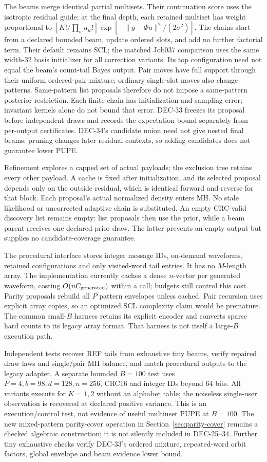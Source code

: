 \documentclass[10pt,a4paper]{article}
\begin{document}
The beams merge identical partial multisets. Their continuation score uses the isotropic residual guide;
at the final depth, each retained multiset has weight proportional to
$[K!/\prod_w a_w!]\exp[-\|y-\Phi a\|^2/(2\sigma^2)]$.
The chains start from a declared bounded beam, update ordered slots, and add no further factorial term.
Their default remains SCL; the matched Job037 comparison uses the same width-32 basis initializer for
all correction variants. Its top configuration need not equal the beam's count-tail Bayes output.
Pair moves have full support through their uniform ordered-pair mixture; ordinary single-slot moves also
change patterns. Same-pattern list proposals therefore do not impose a same-pattern posterior restriction.
Each finite chain has initialization and sampling error; invariant kernels alone do not bound that error.
DEC-33 freezes its proposal before independent draws and records the expectation bound separately from
per-output certificates. DEC-34's candidate union need not give nested final beams: pruning changes
later residual contexts, so adding candidates does not guarantee lower PUPE.

Refinement explores a capped set of actual payloads; the exclusion tree retains every other payload.
A cache is fixed after initialization, and its selected proposal depends only on the outside residual,
which is identical forward and reverse for that block. Each proposal's actual normalized density enters
MH. No stale likelihood or uncorrected adaptive chain is substituted. An empty CRC-valid discovery list
remains empty: list proposals then use the prior, while a beam parent receives one declared prior draw.
The latter prevents an empty output but supplies no candidate-coverage guarantee.

The procedural interface stores integer message IDs, on-demand waveforms, retained configurations and
only visited-word tail entries. It has no $M$-length array. The implementation currently caches a
dense $n$-vector per generated waveform, costing $O(nC_{\rm generated})$ within a call; budgets still
control this cost. Parity proposals rebuild all $P$ pattern envelopes unless cached. Pair recursion uses
explicit array copies, so an optimized SCL complexity claim would be premature.
The common small-$B$ harness retains its explicit encoder and converts sparse hard counts to its legacy
array format. That harness is not itself a large-$B$ execution path.

Independent tests recover REF tails from exhaustive tiny beams, verify repaired draw laws and
single/pair MH balance, and match procedural outputs to the legacy adapter. A separate bounded
$B=100$ test uses $P=4,b=98,d=128,n=256$, CRC16 and integer IDs beyond 64 bits. All variants execute
for $K=1,2$ without an alphabet table; the noiseless single-user observation is recovered at declared
positive variance. This is an execution/control test, not evidence of useful multiuser PUPE at $B=100$.
The new mixed-pattern parity-cover operation in Section~\ref{sec:parity-cover} remains a checked algebraic
construction; it is not silently included in DEC-25--34. Further tiny exhaustive checks verify
DEC-33's ordered mixture, repeated-word orbit factors, global envelope and beam evidence lower bound.
\end{document}
